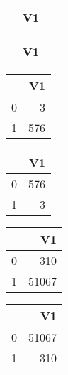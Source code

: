 \bigskip\bigskip
\centering
\begin{tabular}{rr}
  \hline
 & V1 \\ 
  \hline
\hline
\end{tabular}

\bigskip\bigskip
\centering
\begin{tabular}{rr}
  \hline
 & V1 \\ 
  \hline
\hline
\end{tabular}

\bigskip\bigskip
\centering
\begin{tabular}{rr}
  \hline
 & V1 \\ 
  \hline
0 &   3 \\ 
  1 & 576 \\ 
   \hline
\end{tabular}

\bigskip\bigskip
\centering
\begin{tabular}{rr}
  \hline
 & V1 \\ 
  \hline
0 & 576 \\ 
  1 &   3 \\ 
   \hline
\end{tabular}

\bigskip\bigskip
\centering
\begin{tabular}{rr}
  \hline
 & V1 \\ 
  \hline
0 & 310 \\ 
  1 & 51067 \\ 
   \hline
\end{tabular}

\bigskip\bigskip
\centering
\begin{tabular}{rr}
  \hline
 & V1 \\ 
  \hline
0 & 51067 \\ 
  1 & 310 \\ 
   \hline
\end{tabular}

